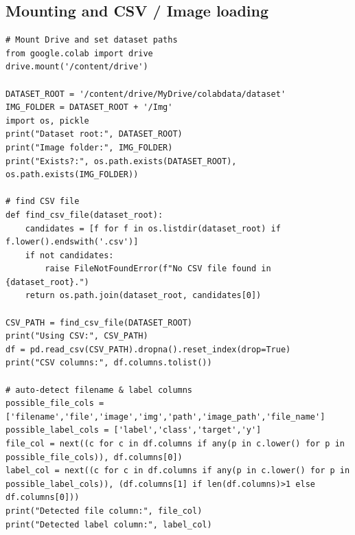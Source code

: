 \documentclass[11pt,a4paper]{article}
\begin{document}
\subsection{Mounting and CSV / Image loading}
\begin{lstlisting}[caption={Mount Drive and auto-detect CSV + load filenames}]
# Mount Drive and set dataset paths
from google.colab import drive
drive.mount('/content/drive')

DATASET_ROOT = '/content/drive/MyDrive/colabdata/dataset'
IMG_FOLDER = DATASET_ROOT + '/Img'
import os, pickle
print("Dataset root:", DATASET_ROOT)
print("Image folder:", IMG_FOLDER)
print("Exists?:", os.path.exists(DATASET_ROOT), os.path.exists(IMG_FOLDER))

# find CSV file
def find_csv_file(dataset_root):
    candidates = [f for f in os.listdir(dataset_root) if f.lower().endswith('.csv')]
    if not candidates:
        raise FileNotFoundError(f"No CSV file found in {dataset_root}.")
    return os.path.join(dataset_root, candidates[0])

CSV_PATH = find_csv_file(DATASET_ROOT)
print("Using CSV:", CSV_PATH)
df = pd.read_csv(CSV_PATH).dropna().reset_index(drop=True)
print("CSV columns:", df.columns.tolist())

# auto-detect filename & label columns
possible_file_cols = ['filename','file','image','img','path','image_path','file_name']
possible_label_cols = ['label','class','target','y']
file_col = next((c for c in df.columns if any(p in c.lower() for p in possible_file_cols)), df.columns[0])
label_col = next((c for c in df.columns if any(p in c.lower() for p in possible_label_cols)), (df.columns[1] if len(df.columns)>1 else df.columns[0]))
print("Detected file column:", file_col)
print("Detected label column:", label_col)
\end{lstlisting}
\end{document}
